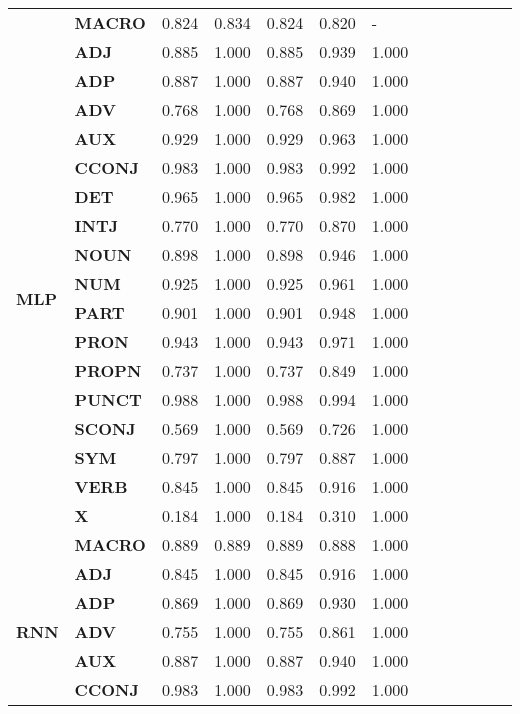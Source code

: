 \begin{longtable}{|l||l||l||l||l||l||l||l||l||l||l||l||l|}
\textbf{} & \textbf{MACRO} & 0.824 & 0.834 & 0.824 & 0.820 & - \\
\cline{1-7}
\multirow[t]{18}{*}{\textbf{MLP}} & \textbf{ADJ} & 0.885 & 1.000 & 0.885 & 0.939 & 1.000 \\
\textbf{} & \textbf{ADP} & 0.887 & 1.000 & 0.887 & 0.940 & 1.000 \\
\textbf{} & \textbf{ADV} & 0.768 & 1.000 & 0.768 & 0.869 & 1.000 \\
\textbf{} & \textbf{AUX} & 0.929 & 1.000 & 0.929 & 0.963 & 1.000 \\
\textbf{} & \textbf{CCONJ} & 0.983 & 1.000 & 0.983 & 0.992 & 1.000 \\
\textbf{} & \textbf{DET} & 0.965 & 1.000 & 0.965 & 0.982 & 1.000 \\
\textbf{} & \textbf{INTJ} & 0.770 & 1.000 & 0.770 & 0.870 & 1.000 \\
\textbf{} & \textbf{NOUN} & 0.898 & 1.000 & 0.898 & 0.946 & 1.000 \\
\textbf{} & \textbf{NUM} & 0.925 & 1.000 & 0.925 & 0.961 & 1.000 \\
\textbf{} & \textbf{PART} & 0.901 & 1.000 & 0.901 & 0.948 & 1.000 \\
\textbf{} & \textbf{PRON} & 0.943 & 1.000 & 0.943 & 0.971 & 1.000 \\
\textbf{} & \textbf{PROPN} & 0.737 & 1.000 & 0.737 & 0.849 & 1.000 \\
\textbf{} & \textbf{PUNCT} & 0.988 & 1.000 & 0.988 & 0.994 & 1.000 \\
\textbf{} & \textbf{SCONJ} & 0.569 & 1.000 & 0.569 & 0.726 & 1.000 \\
\textbf{} & \textbf{SYM} & 0.797 & 1.000 & 0.797 & 0.887 & 1.000 \\
\textbf{} & \textbf{VERB} & 0.845 & 1.000 & 0.845 & 0.916 & 1.000 \\
\textbf{} & \textbf{X} & 0.184 & 1.000 & 0.184 & 0.310 & 1.000 \\
\textbf{} & \textbf{MACRO} & 0.889 & 0.889 & 0.889 & 0.888 & 1.000 \\
\cline{1-7}
\multirow[t]{18}{*}{\textbf{RNN}} & \textbf{ADJ} & 0.845 & 1.000 & 0.845 & 0.916 & 1.000 \\
\textbf{} & \textbf{ADP} & 0.869 & 1.000 & 0.869 & 0.930 & 1.000 \\
\textbf{} & \textbf{ADV} & 0.755 & 1.000 & 0.755 & 0.861 & 1.000 \\
\textbf{} & \textbf{AUX} & 0.887 & 1.000 & 0.887 & 0.940 & 1.000 \\
\textbf{} & \textbf{CCONJ} & 0.983 & 1.000 & 0.983 & 0.992 & 1.000 \\

\end{longtable}
